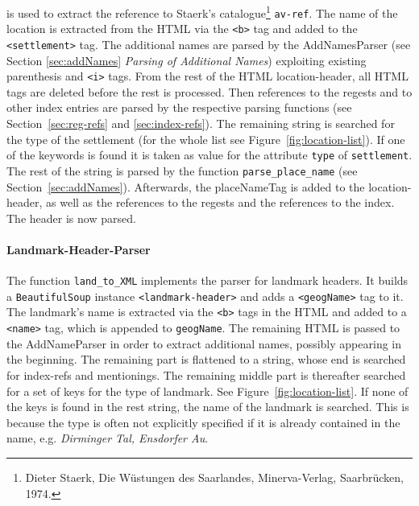 is used to extract the reference to Staerk's catalogue\footnote{Dieter
  Staerk, Die Wüstungen des Saarlandes, Minerva-Verlag, Saarbrücken,
  1974.} \texttt{av-ref}. The name of the location is extracted from
the HTML via the \texttt{<b>} tag and added to the
\texttt{<settlement>} tag. The additional names are parsed by the
AddNamesParser (see Section \ref{sec:addNames} \textit{Parsing of
  Additional Names}) exploiting existing parenthesis and \texttt{<i>}
tags. From the rest of the HTML location-header, all HTML tags are
deleted before the rest is processed. Then references to the regests
and to other index entries are parsed by the respective parsing
functions (see Section~\ref{sec:reg-refs} and \ref{sec:index-refs}).
The remaining string is searched for the type of the settlement (for
the whole list see Figure~\ref{fig:location-list}). If one of the
keywords is found it is taken as value for the attribute \texttt{type}
of \texttt{settlement}. The rest of the string is parsed by the
function \texttt{parse\_place\_name} (see Section~\ref{sec:addNames}).
Afterwards, the placeNameTag is added to the location-header, as well
as the references to the regests and the references to the index. The
header is now parsed.

\paragraph{Landmark-Header-Parser}
The function \texttt{land\_to\_XML} implements the parser for landmark
headers. It builds a \texttt{BeautifulSoup} instance
\texttt{<landmark-header>} and adds a \texttt{<geogName>} tag to it.
The landmark's name is extracted via the \texttt{<b>} tags in the HTML
and added to a \texttt{<name>} tag, which is appended to
\texttt{geogName}. The remaining HTML is passed to the AddNameParser
in order to extract additional names, possibly appearing in the
beginning. The remaining part is flattened to a string, whose end is
searched for index-refs and mentionings. The remaining middle part is
thereafter searched for a set of keys for the type of landmark. See
Figure~\ref{fig:location-list}. If none of the keys is found in the
rest string, the name of the landmark is searched. This is because the
type is often not explicitly specified if it is already contained in
the name, e.g. \textit{Dirminger Tal, Ensdorfer Au}.

